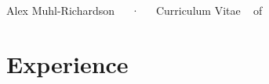 \documentclass[11pt,a4paper,]{awesome-cv}
\begin{document}
\makecvheader

\makecvfooter
  {}
    {Alex Muhl-Richardson~~~·~~~Curriculum Vitae}
  {\thepage~ of \pageref{LastPage}~}





\hypertarget{experience}{%
\section{Experience}\label{experience}}
\end{document}
